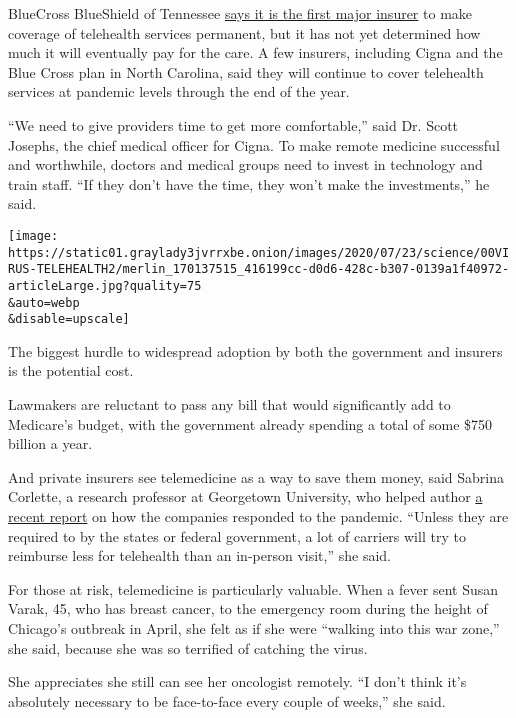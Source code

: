 BlueCross BlueShield of Tennessee
\href{https://bcbstnews.com/pressreleases/bluecross-making-in-network-telehealth-services-permanent/}{says
it is the first major insurer} to make coverage of telehealth services
permanent, but it has not yet determined how much it will eventually pay
for the care. A few insurers, including Cigna and the Blue Cross plan in
North Carolina, said they will continue to cover telehealth services at
pandemic levels through the end of the year.

``We need to give providers time to get more comfortable,'' said Dr.
Scott Josephs, the chief medical officer for Cigna. To make remote
medicine successful and worthwhile, doctors and medical groups need to
invest in technology and train staff. ``If they don't have the time,
they won't make the investments,'' he said.

\texttt{[image: https://static01.graylady3jvrrxbe.onion/images/2020/07/23/science/00VIRUS-TELEHEALTH2/merlin\_170137515\_416199cc-d0d6-428c-b307-0139a1f40972-articleLarge.jpg?quality=75\\\&auto=webp\\\&disable=upscale]}

The biggest hurdle to widespread adoption by both the government and
insurers is the potential cost.

Lawmakers are reluctant to pass any bill that would significantly add to
Medicare's budget, with the government already spending a total of some
\$750 billion a year.

And private insurers see telemedicine as a way to save them money, said
Sabrina Corlette, a research professor at Georgetown University, who
helped author
\href{https://www.rwjf.org/en/library/research/2020/06/the-covid-19-pandemic-insurer-insights-into-challenges-implications-and-lessons-learned.html?cid=xem_other_unpd_ini:moni_dte:20200629_des:insurer\%20insight}{a
recent report} on how the companies responded to the pandemic. ``Unless
they are required to by the states or federal government, a lot of
carriers will try to reimburse less for telehealth than an in-person
visit,'' she said.

For those at risk, telemedicine is particularly valuable. When a fever
sent Susan Varak, 45, who has breast cancer, to the emergency room
during the height of Chicago's outbreak in April, she felt as if she
were ``walking into this war zone,'' she said, because she was so
terrified of catching the virus.

She appreciates she still can see her oncologist remotely. ``I don't
think it's absolutely necessary to be face-to-face every couple of
weeks,'' she said.

